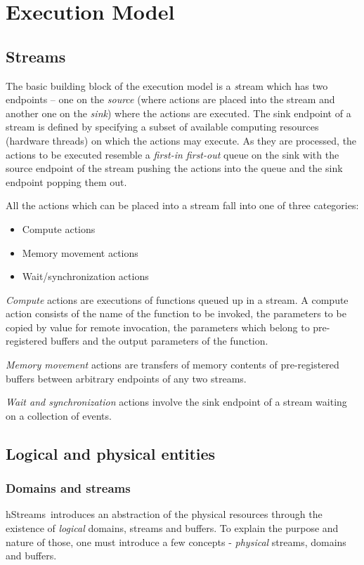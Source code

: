 \documentclass[a4,oneside]{book}
\newcommand{\hstreams}{hStreams}
\begin{document}
\section{Execution Model}
\subsection{Streams}
The basic building block of the execution model is a \emph stream which has two endpoints -- one on the \emph{source} (where actions are placed into the stream and another one on the \emph{sink}) where the actions are executed.
The sink endpoint of a stream is defined by specifying a subset of available computing resources (hardware threads) on which the actions may execute.
As they are processed, the actions to be executed resemble a \emph{first-in first-out} queue on the sink with the source endpoint of the stream pushing the actions into the queue and the sink endpoint popping them out.

All the actions which can be placed into a stream fall into one of three categories:
\begin{itemize}
    \item Compute actions
    \item Memory movement actions
    \item Wait/synchronization actions
\end{itemize}

\emph{Compute} actions are executions of functions queued up in a stream.
A compute action consists of the name of the function to be invoked, the parameters to be copied by value for remote invocation, the parameters which belong to pre-registered buffers and the output parameters of the function.

\emph{Memory movement} actions are transfers of memory contents of pre-registered buffers between arbitrary endpoints of any two streams.

\emph{Wait and synchronization} actions involve the sink endpoint of a stream waiting on a collection of events.

\subsection{Logical and physical entities}
\subsubsection{Domains and streams}
\hstreams\ introduces an abstraction of the physical resources through the existence of \emph{logical} domains, streams and buffers.
To explain the purpose and nature of those, one must introduce a few concepts - \emph{physical} streams, domains and buffers.
\end{document}
